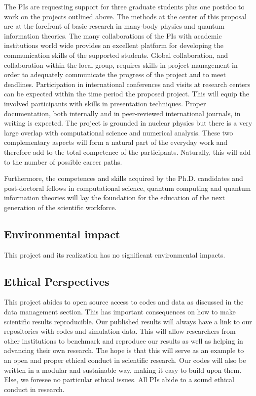 \documentclass[10pt]{article}
\begin{document}
The PIs are requesting support for three graduate students plus one
postdoc to work on the projects outlined above. The methods at the
center of this proposal are at the forefront of basic research in
many-body physics and quantum information theories. The many
collaborations of the PIs with academic institutions world wide
provides an excellent platform for developing the communication skills
of the supported students. Global collaboration, and collaboration
within the local group, requires skills in project management in order
to adequately communicate the progress of the project and to meet
deadlines. Participation in international conferences and visits at
research centers can be expected within the time period the proposed
project. This will equip the involved participants with skills in
presentation techniques.  Proper documentation, both internally and in
peer-reviewed international journals, in writing is expected. The
project is grounded in nuclear physics but there is a very large
overlap with computational science and numerical analysis. These two
complementary aspects will form a natural part of the everyday work
and therefore add to the total competence of the
participants. Naturally, this will add to the number of possible
career paths.

Furthermore, the competences and skills acquired by the Ph.D. candidates and post-doctoral fellows in computational science, quantum computing and quantum information theories will lay the foundation for the education of the next generation of the scientific workforce. 


\subsection{Environmental impact}

This project and its realization has no  significant environmental impacts.

\subsection{Ethical Perspectives}

This project abides to open source access to codes and data as discussed in the data management section. This has important consequences on how to make scientific results reproducible. Our published results will always have a link to our repositories with codes and simulation data. This will allow researchers from other institutions to benchmark and reproduce our results as well as helping in advancing their own 
research. The hope is that this will serve as an example to an open and proper ethical conduct in scientific research.  Our codes will also be written in a modular and sustainable way, making it easy to build upon them. 
Else, we foresee no particular ethical issues. All PIs abide to a sound ethical conduct in research.
\end{document}
